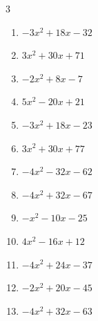 \begin{multicols}{3}
\begin{enumerate}
  \item $-3x^{2}+18x-32$


\columnbreak %

  \item $3x^{2}+30x+71$


  \item $-2x^{2}+8x-7$


  \item $5x^{2}-20x+21$


  \item $-3x^{2}+18x-23$


  \item $3x^{2}+30x+77$


  \item $-4x^{2}-32x-62$


  \item $-4x^{2}+32x-67$


  \item $-x^{2}-10x-25$


  \item $4x^{2}-16x+12$


  \item $-4x^{2}+24x-37$


\columnbreak %

  \item $-2x^{2}+20x-45$


  \item $-4x^{2}+32x-63$



\end{enumerate}
\end{multicols}
